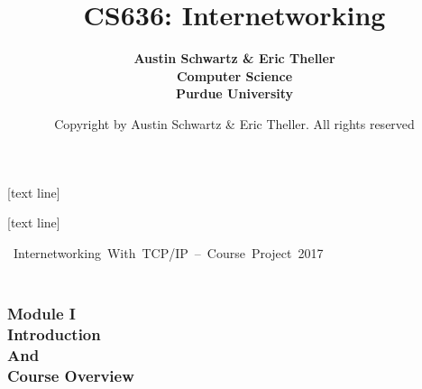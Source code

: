 \documentclass[professionalfonts, t, aspectratio=1610]{beamer}
\title{\textbf{CS636: Internetworking}}
\date[ISPN ’80]{Copyright \textcopyright 2017 by Austin Schwartz \& Eric Theller. All rights reserved}
\author[Comer]{\textbf{Austin Schwartz \& Eric Theller \\ Computer Science \\ Purdue University}}
\begin{document}
{
  [text line]{%
    \parbox{\linewidth}{
      \vspace*{-28pt}
      \centering\insertdate
    }
  }
  \begin{frame}
    \titlepage
  \end{frame}
}

\addtocounter{framenumber}{-1}

[text line]{%
  \parbox{\linewidth}{
    \vspace*{-16pt}
  \hbox{%
    Internetworking With TCP/IP – Course Project
      \insertsectionnavigationhorizontal{.185\paperwidth}{}{}%
   \insertframenumber
      \insertsectionnavigationhorizontal{.4\paperwidth}{}{}%
    2017
    }
    \vspace{0.1cm}
  \hspace*{\fill}%
    \insertdate
  \hspace*{\fill}\vskip2pt%
  }
}

\begin{frame}
\frametitle{ %
\bigskip \bigskip \bigskip \bigskip \bigskip \bigskip \\
Module I \\ \bigskip
Introduction\\
And\\
Course Overview} 
\end{frame}
\end{document}

